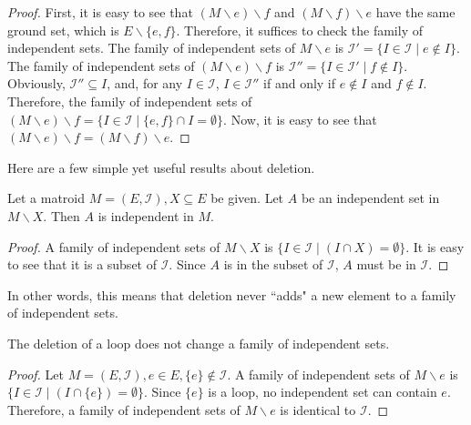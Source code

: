 \begin{proof}
First, it is easy to see that $(M \backslash e) \backslash f$ and $(M \backslash f) \backslash e$ have the same ground set, which is $E \backslash \{ e, f \}$.
Therefore, it suffices to check the family of independent sets.
The family of independent sets of $M \backslash e$ is $\mathcal{I}' = \{ I \in \mathcal{I} \mid e \notin I \}$.
The family of independent sets of $(M \backslash e) \backslash f$ is $\mathcal{I}'' = \{ I \in \mathcal{I}' \mid f \notin I \}$.
Obviously, $\mathcal{I}'' \subseteq I$, and, for any $I \in \mathcal{I}$, $I \in \mathcal{I}''$ if and only if $e \notin I$ and $f \notin I$.
Therefore, the family of independent sets of $(M \backslash e) \backslash f = \{ I \in \mathcal{I} \mid \{ e, f \} \cap I = \emptyset \}$.
Now, it is easy to see that $(M \backslash e) \backslash f = (M \backslash f) \backslash e$.
\end{proof}

Here are a few simple yet useful results about deletion.

\begin{thm}
Let a matroid $M = (E, \mathcal{I}), X \subseteq E$ be given.
Let $A$ be an independent set in $M \backslash X$.
Then $A$ is independent in $M$.
\end{thm}

\begin{proof}
A family of independent sets of $M \backslash X$ is $\{ I \in \mathcal{I} \mid (I \cap X) = \emptyset \}$.
It is easy to see that it is a subset of $\mathcal{I}$.
Since $A$ is in the subset of $\mathcal{I}$, $A$ must be in $\mathcal{I}$.
\end{proof}

In other words, this means that deletion never ``adds" a new element to a family of independent sets.

\begin{thm}
The deletion of a loop does not change a family of independent sets.
\end{thm}

\begin{proof}
Let $M = (E, \mathcal{I}), e \in E, \{ e \} \notin \mathcal{I}$.
A family of independent sets of $M \backslash e$ is $\{ I \in \mathcal{I} \mid (I \cap \{ e \}) = \emptyset \}$.
Since $\{ e \}$ is a loop, no independent set can contain $e$.
Therefore, a family of independent sets of $M \backslash e$ is identical to $\mathcal{I}$.
\end{proof}

